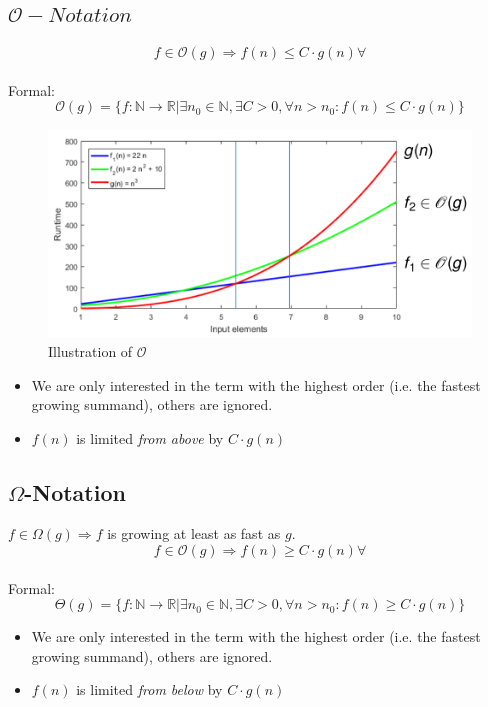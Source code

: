 \documentclass[12pt, a4paper]{scrartcl}
\begin{document}
\subsection{$\mathcal{O}-Notation$}
\label{sec:O-notation}
\[f\in\mathcal{O}(g)\Rightarrow f(n)\le C\cdot g(n)\forall\]\\
Formal:
\begin{equation}
\mathcal{O}(g)=\{f:\mathbb{N}\rightarrow\mathbb{R}|\exists n_0\in\mathbb{N}, \exists C>0, \forall n>n_0:f(n)\le C\cdot g(n)\}
\end{equation}
\begin{figure}[htbp]
  \centering
  \includegraphics[width=.9\textwidth]{bigO}
  \caption{Illustration of $\mathcal{O}$}
  \label{fig:big-O-illustration}
\end{figure}
\begin{itemize}
\item We are only interested in the term with the highest order (i.e. the fastest growing summand), others are ignored.
\item $f(n)$ is limited \emph{from above} by $C\cdot g(n)$
\end{itemize}

\subsection{$\Omega$-Notation}
\label{sec:omega-notation}
$f\in\Omega(g)\Rightarrow f$ is growing at least as fast as $g$.
\[f\in\mathcal{O}(g)\Rightarrow f(n)\ge C\cdot g(n)\forall\]\\
Formal:
\[\Theta(g)=\{f:\mathbb{N}\rightarrow\mathbb{R}|\exists n_0\in\mathbb{N}, \exists C>0, \forall n>n_0:f(n)\ge C\cdot g(n)\}
\]
\begin{itemize}
\item We are only interested in the term with the highest order (i.e. the fastest growing summand), others are ignored.
\item $f(n)$ is limited \emph{from below} by $C\cdot g(n)$
\end{itemize}
\end{document}
